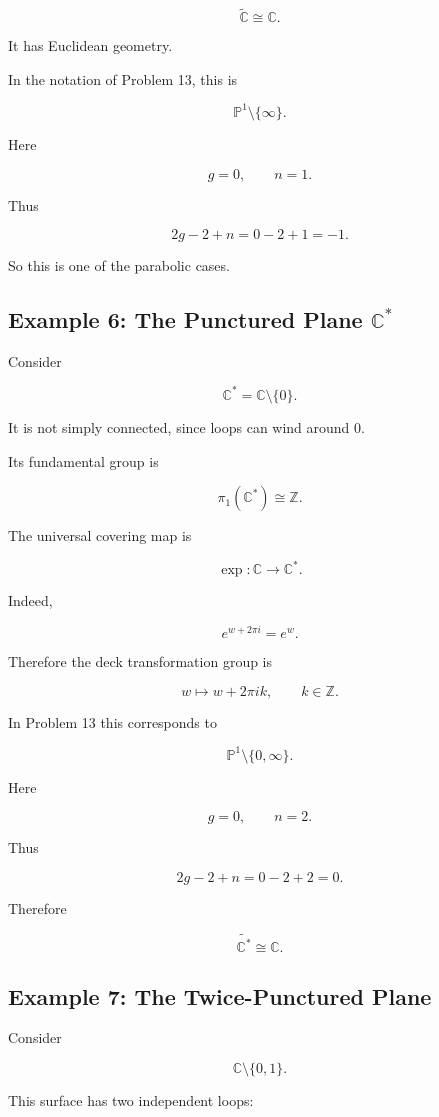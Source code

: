 \documentclass[12pt,a4paper]{article}
\theoremstyle{notespace}
\begin{document}
\[
\widetilde{\mathbb C}
\cong
\mathbb C.
\]

It has Euclidean geometry.

In the notation of Problem 13, this is

\[
\mathbb P^1\setminus\{\infty\}.
\]

Here

\[
g=0,
\qquad
n=1.
\]

Thus

\[
2g-2+n
=
0-2+1
=
-1.
\]

So this is one of the parabolic cases.

\subsection{Example 6: The Punctured Plane \(\mathbb C^*\)}

Consider

\[
\mathbb C^*
=
\mathbb C\setminus\{0\}.
\]

It is not simply connected, since loops can wind around \(0\).

Its fundamental group is

\[
\pi_1(\mathbb C^*)
\cong
\mathbb Z.
\]

The universal covering map is

\[
\exp:\mathbb C\to\mathbb C^*.
\]

Indeed,

\[
e^{w+2\pi i}=e^w.
\]

Therefore the deck transformation group is

\[
w\mapsto w+2\pi i k,
\qquad k\in\mathbb Z.
\]

In Problem 13 this corresponds to

\[
\mathbb P^1\setminus\{0,\infty\}.
\]

Here

\[
g=0,
\qquad
n=2.
\]

Thus

\[
2g-2+n
=
0-2+2
=
0.
\]

Therefore

\[
\widetilde{\mathbb C^*}
\cong
\mathbb C.
\]

\subsection{Example 7: The Twice-Punctured Plane}

Consider

\[
\mathbb C\setminus\{0,1\}.
\]

This surface has two independent loops:
\end{document}
